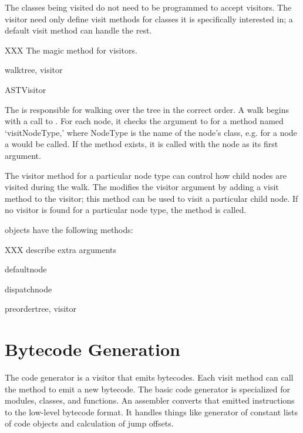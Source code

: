The classes being visited do not need to be programmed to accept
visitors.  The visitor need only define visit methods for classes it
is specifically interested in; a default visit method can handle the
rest. 

XXX The magic  method for visitors.

\begin{funcdesc}{walk}{tree, visitor}
\end{funcdesc}

\begin{classdesc}{ASTVisitor}{}

The  is responsible for walking over the tree in the
correct order.  A walk begins with a call to .  For
each node, it checks the  argument to 
for a method named `visitNodeType,' where NodeType is the name of the
node's class, e.g. for a  node a 
would be called.  If the method exists, it is called with the node as
its first argument.

The visitor method for a particular node type can control how child
nodes are visited during the walk.  The  modifies
the visitor argument by adding a visit method to the visitor; this
method can be used to visit a particular child node.  If no visitor is
found for a particular node type, the  method is
called. 
\end{classdesc}

 objects have the following methods:

XXX describe extra arguments

\begin{methoddesc}{default}{node\optional{, \moreargs}}
\end{methoddesc}

\begin{methoddesc}{dispatch}{node\optional{, \moreargs}}
\end{methoddesc}

\begin{methoddesc}{preorder}{tree, visitor}
\end{methoddesc}


\section{Bytecode Generation}

The code generator is a visitor that emits bytecodes.  Each visit method
can call the  method to emit a new bytecode.  The basic
code generator is specialized for modules, classes, and functions.  An
assembler converts that emitted instructions to the low-level bytecode
format.  It handles things like generator of constant lists of code
objects and calculation of jump offsets.
